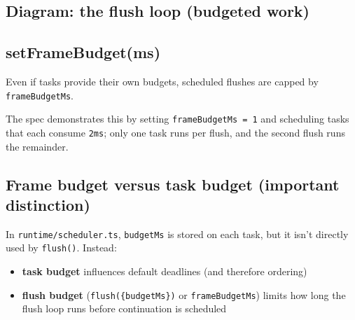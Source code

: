 \subsection*{Diagram: the flush loop (budgeted work)}

\begin{center}
\end{center}

\subsection{setFrameBudget(ms)}

Even if tasks provide their own budgets, scheduled flushes are capped by \texttt{frameBudgetMs}.

The spec demonstrates this by setting \texttt{frameBudgetMs = 1} and scheduling tasks that each consume \texttt{2ms}; only one task runs per flush, and the second flush runs the remainder.

\subsection{Frame budget versus task budget (important distinction)}

In \texttt{runtime/scheduler.ts}, \texttt{budgetMs} is stored on each task, but it isn't directly used by \texttt{flush()}.
Instead:

\begin{itemize}
  \item \textbf{task budget} influences default deadlines (and therefore ordering)
  \item \textbf{flush budget} (\texttt{flush(\{budgetMs\})} or \texttt{frameBudgetMs}) limits how long the flush loop runs before continuation is scheduled
\end{itemize}

